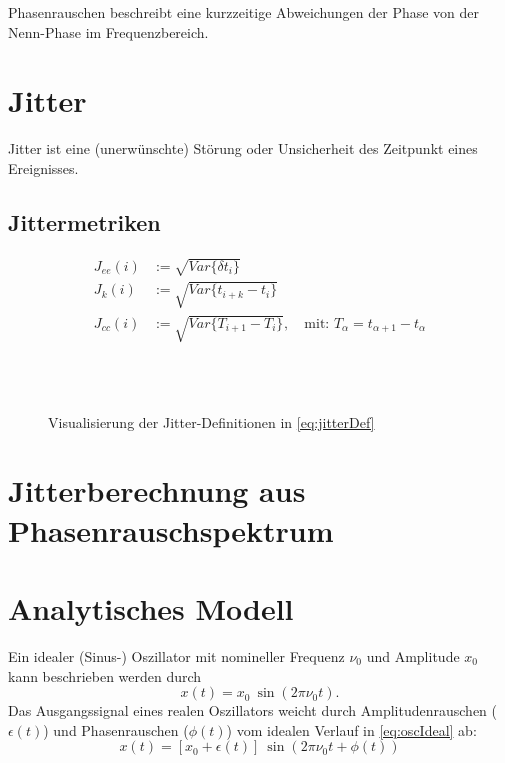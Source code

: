 \begin{definition}[Phasenrauschen]
	Phasenrauschen beschreibt eine kurzzeitige Abweichungen der Phase von der Nenn-Phase im Frequenzbereich. \cite{IEEErandom}
\end{definition}


\section{Jitter}

\begin{definition}[Jitter]
	Jitter ist eine (unerwünschte) Störung oder Unsicherheit des Zeitpunkt eines Ereignisses. \cite{Kundert2012}
\end{definition}

\subsection{Jittermetriken}

\begin{subequations}
	\label{eq:jitterDef}
	\begin{align}
	J_{ee}(i)&:=\sqrt{Var\{\delta t_i\}} \\
	J_k(i)&:=\sqrt{Var\{t_{i+k}-t_i\}} \\
	J_{cc}(i)&:=\sqrt{Var\{T_{i+1}-T_i\}}, \quad \text{mit: } T_\alpha=t_{\alpha+1}-t_\alpha
	\end{align}
\end{subequations}

\begin{figure}[H]
	\centering
	\\[4ex]
	\\[4ex]
	\caption{Visualisierung der Jitter-Definitionen in \autoref{eq:jitterDef}}
\end{figure}



\section{Jitterberechnung aus Phasenrauschspektrum}

\section{Analytisches Modell}
Ein idealer (Sinus-) Oszillator mit nomineller Frequenz $\nu_0$ und Amplitude $x_0$ kann beschrieben werden durch
\begin{equation}
\label{eq:oscIdeal}
	x(t)=x_0 \: \sin(2\pi \nu_0 t).
\end{equation}
Das Ausgangssignal eines realen Oszillators weicht durch Amplitudenrauschen ($\epsilon(t)$) und Phasenrauschen ($\phi(t)$) vom idealen Verlauf in \autoref{eq:oscIdeal} ab:
\begin{equation}
	x(t)=[x_0 + \epsilon(t)] \: \sin(2\pi \nu_0 t + \phi(t))
\end{equation}

